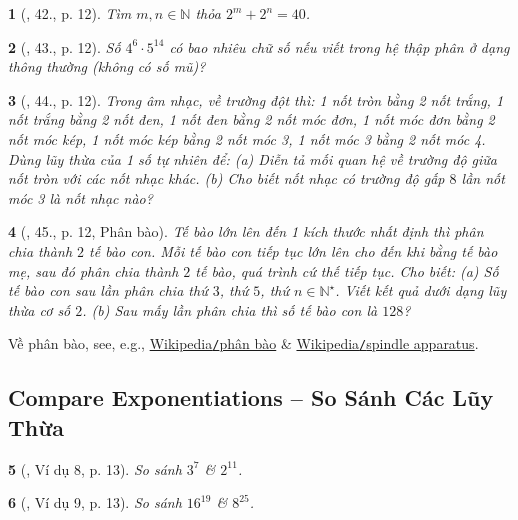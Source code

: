 \documentclass{article}
\newtheorem{baitoan}{}
\begin{document}
\begin{baitoan}[\cite{Tuyen_Toan_6}, 42., p. 12]
	Tìm $m,n\in\mathbb{N}$ thỏa $2^m + 2^n = 40$.
\end{baitoan}

\begin{baitoan}[\cite{Tuyen_Toan_6}, 43., p. 12]
	Số $4^6\cdot5^{14}$ có bao nhiêu chữ số nếu viết trong hệ thập phân ở dạng thông thường (không có số mũ)?
\end{baitoan}

\begin{baitoan}[\cite{Tuyen_Toan_6}, 44., p. 12]
	Trong âm nhạc, về trường đột thì: 1 nốt tròn bằng 2 nốt trắng, 1 nốt trắng bằng 2 nốt đen, 1 nốt đen bằng 2 nốt móc đơn, 1 nốt móc đơn bằng 2 nốt móc kép, 1 nốt móc kép bằng 2 nốt móc 3, 1 nốt móc 3 bằng 2 nốt móc 4. Dùng lũy thừa của 1 số tự nhiên để: (a) Diễn tả mối quan hệ về trường độ giữa nốt tròn với các nốt nhạc khác. (b) Cho biết nốt nhạc có trường độ gấp $8$ lần nốt móc 3 là nốt nhạc nào?
\end{baitoan}

\begin{baitoan}[\cite{Tuyen_Toan_6}, 45., p. 12, Phân bào]
	Tế bào lớn lên đến 1 kích thước nhất định thì phân chia thành $2$ tế bào con. Mỗi tế bào con tiếp tục lớn lên cho đến khi bằng tế bào mẹ, sau đó phân chia thành $2$ tế bào, quá trình cứ thế tiếp tục. Cho biết: (a) Số tế bào con sau lần phân chia thứ $3$, thứ $5$, thứ $n\in\mathbb{N}^\star$. Viết kết quả dưới dạng lũy thừa cơ số $2$. (b) Sau mấy lần phân chia thì số tế bào con là $128$?
\end{baitoan}
Về phân bào, see, e.g., \href{https://vi.wikipedia.org/wiki/Ph%C3%A2n_b%C3%A0o}{Wikipedia{\tt/}phân bào} \& \href{https://en.wikipedia.org/wiki/Spindle_apparatus}{Wikipedia{\tt/}spindle apparatus}.


\subsection{Compare Exponentiations -- So Sánh Các Lũy Thừa}

\begin{baitoan}[\cite{Tuyen_Toan_6}, Ví dụ 8, p. 13]
	So sánh $3^7$ \& $2^{11}$.
\end{baitoan}

\begin{baitoan}[\cite{Tuyen_Toan_6}, Ví dụ 9, p. 13]
	So sánh $16^{19}$ \& $8^{25}$.
\end{baitoan}
\end{document}
